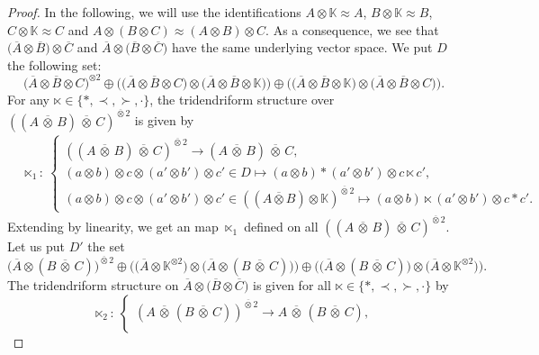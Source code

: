 \documentclass[pdftex]{sigma}
\numberwithin{equation}{section}
\theoremstyle{definition}
\theoremstyle{plain}
\newcommand{\K}{\mathbb{K}}
\begin{document}
\begin{proof}
In the following, we will use the identifications $A\otimes \K\approx A$, $B\otimes \K\approx B$, $C\otimes \K\approx C$ and $A\otimes(B\otimes C)\approx (A\otimes B)\otimes C$. As a consequence, we see that $\big(\overline{A}\otimes \overline{B}\big)\otimes \overline{C}$ and $\overline{A}\otimes \big(\overline{B}\otimes \overline{C}\big)$ have the same underlying vector space.
 We put $D$ the following set:
 \[
 \big(\overline{A} \otimes \overline{B}\otimes C\big)^{\otimes 2} \oplus\big(\big(\overline{A}\otimes \overline{B}\otimes C\big)\otimes \big(\overline{A}\otimes \overline{B}\otimes \K\big)\big) \oplus \big(\big(\overline{A}\otimes \overline{B}\otimes \K\big)\otimes \big(\overline{A}\otimes \overline{B}\otimes C\big)\big).
 \]
 For any $\ltimes\in\{*,\prec,\succ,\cdot\}$, the tridendriform structure over $((A \,\overline{\otimes}\, B)\,\overline{\otimes}\, C)^{\overline{\otimes} 2}$ is given by
	\begin{align*}
	&\ltimes_{1}\colon \ \begin{cases}
	 ((A \,\overline{\otimes}\, B)\,\overline{\otimes}\, C)^{\overline{\otimes} 2} \rightarrow (A\,\overline{\otimes}\,B)\,\overline{\otimes}\, C ,\\
	(a\otimes b)\otimes c \otimes (a'\otimes b')\otimes c'\in D \mapsto (a\otimes b)*(a'\otimes b')\otimes c\ltimes c', \\
	(a\otimes b)\otimes c \otimes (a'\otimes b')\otimes c'\in ((A\overline{\otimes} B)\otimes \K)^{\overline{\otimes} 2} \mapsto (a\otimes b)\ltimes(a'\otimes b')\otimes c* c'.
	\end{cases}
\end{align*}
Extending by linearity, we get an map $\ltimes_{1}$ defined on all $((A\,\overline{\otimes}\, B)\,\overline{\otimes}\, C)^{\overline{\otimes} 2}.$
Let us put $D'$ the set
\[
\big(\overline{A}\otimes (B\,\overline{\otimes}\,C)\big)^{\overline{\otimes} 2}\oplus \big(\big(\overline{A}\otimes \K^{\otimes 2}\big)\otimes \big(\overline{A}\otimes (B\,\overline{\otimes}\,C)\big)\big)\oplus \big(\big(\overline{A}\otimes (B\,\overline{\otimes}\,C)\big)\otimes \big(\overline{A}\otimes \K^{\otimes 2}\big)\big).
\]
The tridendriform structure on $\overline{A} \otimes \big(\overline{B}\otimes \overline{C}\big)$ is given for all $\ltimes\in \{ *,\prec,\succ,\cdot \}$ by
\begin{equation*}
	\ltimes_2\colon \ \begin{cases}
	 (A\,\overline{\otimes}\, (B\,\overline{\otimes}\, C))^{\overline{\otimes} 2} \rightarrow A\,\overline{\otimes}\,(B\,\overline{\otimes}\, C), \\

\end{cases}
\end{equation*}
\end{proof}
\end{document}
